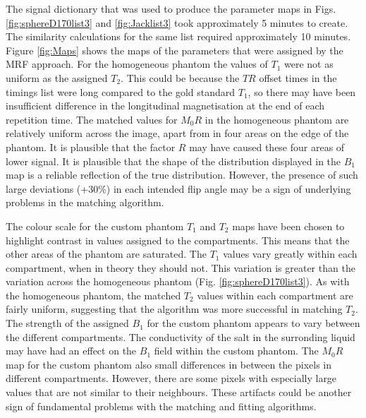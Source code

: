\documentclass[journal]{IEEEtran}
\begin{document}
The signal dictionary that was used to produce the parameter maps in Figs. \ref{fig:sphereD170list3} and \ref{fig:Jacklist3} took approximately 5 minutes to create. The similarity calculations for the same list required approximately 10 minutes. Figure \ref{fig:Maps} shows the maps of the parameters that were assigned by the MRF approach. For the homogeneous phantom the values of $T_1$ were not as uniform as the assigned $T_2$. This could be because the $TR$ offset times in the timings list were long compared to the gold standard $T_1$, so there may have been insufficient difference in the longitudinal magnetisation at the end of each repetition time. The matched values for $M_{0}R$ in the homogeneous phantom are relatively uniform across the image, apart from in four areas on the edge of the phantom. It is plausible that the factor $R$ may have caused these four areas of lower signal. It is plausible that the shape of the distribution displayed in the $B_1$ map is a reliable reflection of the true distribution. However, the presence of such large deviations (+30\%) in each intended flip angle may be a sign of underlying problems in the matching algorithm.

The colour scale for the custom phantom $T_1$ and $T_2$ maps have been chosen to highlight contrast in values assigned to the compartments. This means that the other areas of the phantom are saturated. The $T_1$ values vary greatly within each compartment, when in theory they should not. This variation is greater than the variation across the homogeneous phantom (Fig. \ref{fig:sphereD170list3}). As with the homogeneous phantom, the matched $T_2$ values within each compartment are fairly uniform, suggesting that the algorithm was more successful in matching $T_2$. The strength of the assigned $B_1$ for the custom phantom appears to vary between the different compartments. The conductivity of the salt in the surronding liquid may have had an effect on the $B_1$ field within the custom phantom. The $M_{0}R$ map for the custom phantom also small differences in between the pixels in different compartments. However, there are some pixels with especially large values that are not similar to their neighbours. These artifacts could be another sign of fundamental problems with the matching and fitting algorithms.
\end{document}

